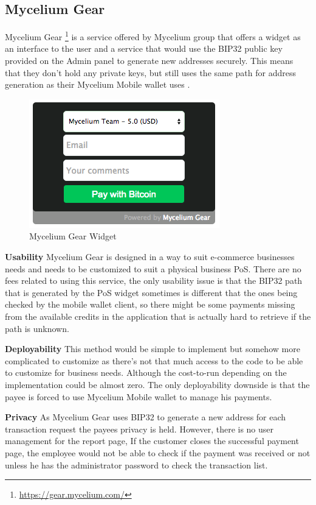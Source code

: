 \subsection{Mycelium Gear}
Mycelium Gear \footnote{\url{https://gear.mycelium.com/}} is a service offered by Mycelium group that offers a widget as an interface to the user and a service that would use the BIP32 public key provided on the Admin panel to generate new addresses securely. This means that they don't hold any private keys, but still uses the same path for address generation as their Mycelium Mobile wallet uses .

\begin{figure}[h]
\centering
\includegraphics[scale=0.5]{fig/Mycelium_gear.png}
  \caption{Mycelium Gear Widget}
\label{fig:mycelium-widget}
\end{figure}


\textbf{Usability}
Mycelium Gear is designed in a way to suit e-commerce businesses needs and needs to be customized to suit a physical business PoS. There are no fees related to using this service, the only usability issue is that the BIP32 path that is generated by the PoS widget sometimes is different that the ones being checked by the mobile wallet client, so there might be some payments missing from the available credits in the application that is actually hard to retrieve if the path is unknown.

\textbf{Deployability}
This method would be simple to implement but somehow more complicated to customize as there's not that much access to the code to be able to customize for business needs. Although the cost-to-run depending on the implementation could be almost zero. The only deployability downside is that the payee is forced to use Mycelium Mobile wallet to manage his payments.

 \textbf{Privacy}
As Mycelium Gear uses BIP32 to generate a new address for each transaction request the payees privacy is held. However, there is no user management for the report page, If the customer closes the successful payment page, the employee would not be able to check if the payment was received or not unless he has the administrator password to check the transaction list.

